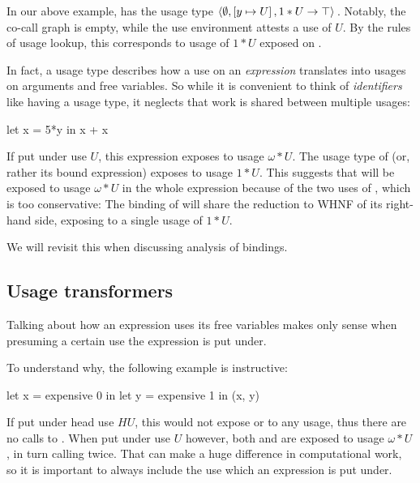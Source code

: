 In our above example,  has the usage type $\left\langle{}\emptyset,\left[y\mapsto U\right],1*U \to \top\right\rangle{}$.
Notably, the co-call graph is empty, while the use environment attests  a use of $U$.
By the rules of usage lookup, this corresponds to usage of $1*U$ exposed on .

In fact, a usage type describes how a use on an \emph{expression} translates into usages on arguments and free variables.
So while it is convenient to think of \emph{identifiers} like  having a usage type, it neglects that work is shared between multiple usages:

\begin{haskellcode}
let x = 5*y
in x + x
\end{haskellcode}

If put under use $U$, this expression exposes  to usage $\omega*U$. 
The usage type of  (or, rather its bound expression) exposes  to usage $1*U$.
This suggests that  will be exposed to usage $\omega*U$ in the whole expression because of the two uses of , which is too conservative:
The binding of  will share the reduction to WHNF of its right-hand side, exposing  to a single usage of $1*U$.

We will revisit this when discussing analysis of  bindings.

\subsection{Usage transformers}\label{sec:utrans}

Talking about how an expression uses its free variables makes only sense when presuming a certain use the expression is put under.

To understand why, the following example is instructive:

\begin{haskellcode}
let x = expensive 0
in let y = expensive 1
   in (x, y)
\end{haskellcode}

If put under head use $HU$, this would not expose  or  to any usage, thus there are no calls to .
When put under use $U$ however, both  and  are exposed to usage $\omega*U$, in turn calling  twice.
That can make a huge difference in computational work, so it is important to always include the use which an expression is put under.


